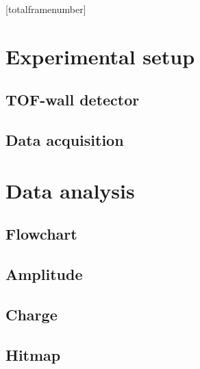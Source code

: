 \documentclass[9pt]{beamer}
\begin{document}
	[totalframenumber] 
	\frame{\titlepage}

	

	\section{Experimental setup}
		\subsection{TOF-wall detector}
			
			
			
		\subsection{Data acquisition}
			
		
	\section{Data analysis}
		\subsection{Flowchart}
			
		\subsection{Amplitude}
			
			
		\subsection{Charge}
			
			
		\subsection{Hitmap}
			

		
\end{document}
